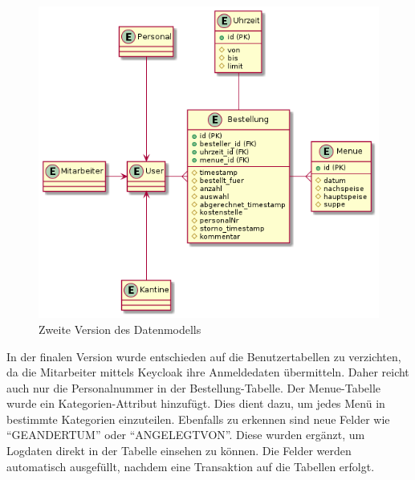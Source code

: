 \begin{figure}[htp]
    \centering
    \includegraphics[scale=0.6]{pics/erd-aktuell.png}
    \caption{Zweite Version des Datenmodells}
    \label{fig:impl:ERDSecond}
\end{figure}

In der finalen Version wurde entschieden auf die Benutzertabellen zu verzichten, da die Mitarbeiter mittels Keycloak ihre Anmeldedaten übermitteln. Daher reicht auch nur die Personalnummer
in der Bestellung-Tabelle. Der Menue-Tabelle wurde ein Kategorien-Attribut hinzufügt. Dies dient dazu, um jedes Menü in bestimmte Kategorien einzuteilen. Ebenfalls zu erkennen sind neue Felder 
wie ``GEANDERTUM'' oder ``ANGELEGTVON''. Diese wurden ergänzt, um Logdaten direkt in der Tabelle einsehen zu können. Die Felder werden automatisch ausgefüllt, nachdem 
eine Transaktion auf die Tabellen erfolgt.

